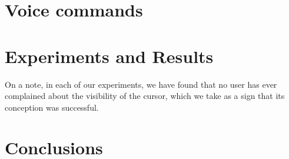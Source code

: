 \documentclass[a4paper, 11pt, twocolumn]{IEEEtran}
\begin{document}
    \section{Voice commands}

    \section{Experiments and Results}

    On a note, in each of our experiments, we have found that no user has ever complained about the visibility of the cursor, which we take as a sign that its conception was successful.

    \section{Conclusions}
\end{document}
